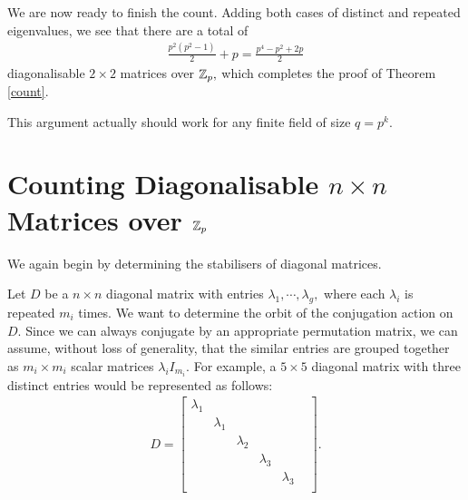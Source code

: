 \documentclass[11pt, titlepage, a4paper]{article}
\begin{document}
We are now ready to finish the count. Adding both cases of distinct and repeated eigenvalues, we see that there are a total of 
\begin{align*}
 \frac{p^{2}(p^{2}-1)}{2} + p = \frac{p^{4} - p^{2}+2p}{2}
\end{align*}
diagonalisable $2\times 2$ matrices over $\mathbb{Z}_{p},$ which completes the proof of Theorem \ref{count}.

\begin{note}
 This argument actually should work for any finite field of size $q = p^{k}.$
\end{note}

\section{Counting Diagonalisable $n\times n$ Matrices over $\mathbb{Z}_{p}$}


We again begin by determining the stabilisers of diagonal matrices.

Let $D$ be a $n\times n$ diagonal matrix with entries $\lambda_{1},\cdots, \lambda_{g},$ where each $\lambda_{i}$ is repeated $m_{i}$ times. We want to determine the orbit of the conjugation action on $D.$ Since we can always conjugate by an appropriate permutation matrix, we can assume, without loss of generality, that the similar entries are grouped together as $m_{i}\times m_{i}$ scalar matrices $\lambda_{i}I_{m_{i}}.$ For example, a $5\times 5$ diagonal matrix with three distinct entries would be represented as follows:
\begin{align*}
D =  \begin{bmatrix}
 \lambda_{1} & & & & \\
 & \lambda_{1} & & & & \\
 & &  \lambda_{2}& & & \\
 & & &  \lambda_{3}& & \\
 & & & &   \lambda_{3}\\
\end{bmatrix}.
\end{align*}
\end{document}
